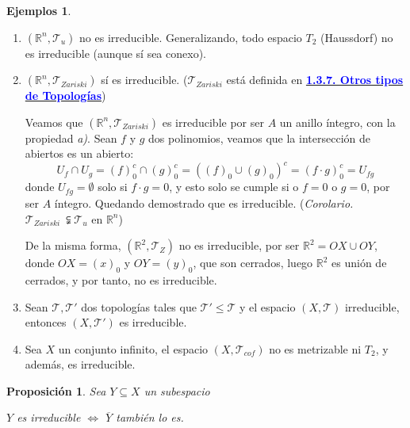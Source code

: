 \documentclass[12pt,twoside]{report}
\newcommand\mc[1]{\mathcal{#1}}
\theoremstyle{azul}
\theoremstyle{azul2}
\theoremstyle{plain}
\newtheorem*{prop}{Proposición}
\theoremstyle{definition}
\newtheorem*{ejes}{Ejemplos}
\theoremstyle{remark}
\begin{document}
\begin{ejes} \: 
     \begin{enumerate}[1)]
         \item $(\mathbb{R}^n, \mc{T}_u)$ no es irreducible. Generalizando, todo espacio $T_2$ (Haussdorf) no es irreducible (aunque sí sea conexo). \justifying
         \item $(\mathbb{R}^n, \mc{T}_{Zariski})$ sí es irreducible. ($\mc{T}_{Zariski}$ está definida en \hyperref[topz]{\textcolor{blue}{\textbf{1.3.7. Otros tipos de Topologías}}}) 
         
        Veamos que $(\mathbb{R}^n, \mc{T}_{Zariski})$ es irreducible por ser $A$ un anillo íntegro, con la propiedad \textit{a)}. Sean $f$ y $g$ dos polinomios, veamos que la intersección de abiertos es un abierto:
        $$U_f \cap U_g = (f)_0^c \cap (g)_0^c = ((f)_0 \cup (g)_0)^c = (f \cdot g)_0^c = U_{fg}$$
        donde $U_{fg}=\emptyset$ solo si $f \cdot g = 0$, y esto solo se cumple si o $f=0$ o $g=0$, por ser $A$ {\'in}tegro. Quedando demostrado que es irreducible. 
        (\textit{Corolario.} $\mc{T}_{Zariski} \: \subsetneqq \mc{T}_u$ en $\mathbb{R}^n$)

        De la misma forma, $(\mathbb{R}^2,\mc{T}_Z)$ no es irreducible, por ser $\mathbb{R}^2=OX\cup OY$, donde $OX=(x)_0$ y $OY=(y)_0$, que son cerrados, luego $\mathbb{R}^2$ es unión de cerrados, y por tanto, no es irreducible. 
        \item Sean $\mc{T}, \mc{T}'$ dos topologías tales que $\mc{T}' \leq \mc{T}$ y el espacio $(X, \mc{T})$ irreducible, entonces $(X,\mc{T}')$ es irreducible. 
        \item Sea $X$ un conjunto infinito, el espacio $(X, \mc{T}_{cof})$ no es metrizable ni $T_2$, y además, es irreducible.
         \end{enumerate}
\end{ejes}
\begin{prop} Sea $Y \subseteq X$ un subespacio \vspace{-3mm}
 \begin{center}
      $Y$ es irreducible $\Leftrightarrow$ $\overline{Y}$ tambi{\'e}n lo es. 
 \end{center}
 \end{prop}
\end{document}
